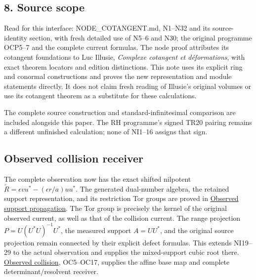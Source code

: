 \documentclass[
]{article}
\newcounter{none} %
\begin{document}
\subsection{8. Source scope}\label{source-scope}

Read for this interface: NODE\_COTANGENT.md, N1--N32 and its
source-identity section, with fresh detailed use of N5--6 and N30; the
original programme OCP5--7 and the complete current formulas. The node
proof attributes its cotangent foundations to Luc Illusie,
\emph{Complexe cotangent et déformations}, with exact theorem locators
and edition distinctions. This note uses its explicit ring and conormal
constructions and proves the new representation and module statements
directly. It does not claim fresh reading of Illusie's original volumes
or use its cotangent theorem as a substitute for these calculations.

The complete source construction and standard-infinitesimal comparison
are included alongside this paper. The RH programme's signed TR20
pairing remains a different unfinished calculation; none of NI1--16
assigns that sign.

\subsection{Observed collision
receiver}\label{observed-collision-receiver}

The complete observation now has the exact shifted nilpotent
\(\widetilde R=\epsilon vu^*-(\epsilon r/a)uu^*\). The generated
dual-number algebra, the retained support representation, and its
restriction Tor groups are proved in
\href{https://github.com/KokunoYumeto/zeta-function-research-reader/blob/c9df443d9e1df000dfbb083943f97197e746eb08/workbenches/splitzero-tandem/branches/identity-absorber-square/OBSERVED_SUPPORT_PROPAGATION.md}{Observed
support propagation}. The Tor group is precisely the kernel of the
original observed current, as well as that of the collision current. The
range projection \(P=U(U^*U)^{-1}U^*\), the measured support \(A=UU^*\),
and the original source projection remain connected by their explicit
defect formulas. This extends NI19--29 to the actual observation and
supplies the mixed-support cubic root there.
\href{https://github.com/KokunoYumeto/zeta-function-research-reader/blob/c9df443d9e1df000dfbb083943f97197e746eb08/workbenches/splitzero-tandem/branches/identity-absorber-square/OBSERVED_COLLISION.md}{Observed
collision}, OC5--OC17, supplies the affine base map and complete
determinant/resolvent receiver.
\end{document}
